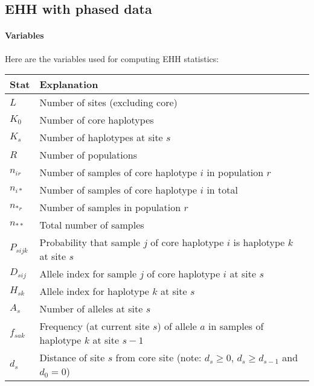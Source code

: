\documentclass{scrartcl}
\begin{document}

\subsection{EHH with phased data}

\paragraph{Variables}

Here are the variables used for computing EHH statistics: \\

\begin{tabular}{ l l }                                                                                            \hline
    Stat        &  Explanation                                                                                 \\ \hline
    $L$         &  Number of sites (excluding core)                                                            \\
    $K_0$       &  Number of core haplotypes                                                                   \\
    $K_s$       &  Number of haplotypes at site $s$                                                            \\
    $R$         &  Number of populations                                                                       \\
    $n_{ir}$    &  Number of samples of core haplotype $i$ in population $r$                                   \\
    $n_{i*}$    &  Number of samples of core haplotype $i$ in total                                            \\
    $n_{*r}$    &  Number of samples in population $r$                                                         \\
    $n_{**}$    &  Total number of samples                                                                     \\
    $P_{sijk}$  &  Probability that sample $j$ of core haplotype $i$ is haplotype $k$ at site $s$              \\
    $D_{sij}$   &  Allele index for sample $j$ of core haplotype $i$ at site $s$                               \\
    $H_{sk}$    &  Allele index for haplotype $k$ at site $s$                                                  \\
    $A_s$       &  Number of alleles at site $s$                                                               \\
    $f_{sak}$   &  Frequency (at current site $s$) of allele $a$ in samples of haplotype $k$ at site $s-1$     \\
    $d_s$       &  Distance of site $s$ from core site (note: $d_s \geq 0$, $d_s \geq d_{s-1}$ and $d_0 = 0$)  \\ \hline
\end{tabular}
\\
\end{document}
